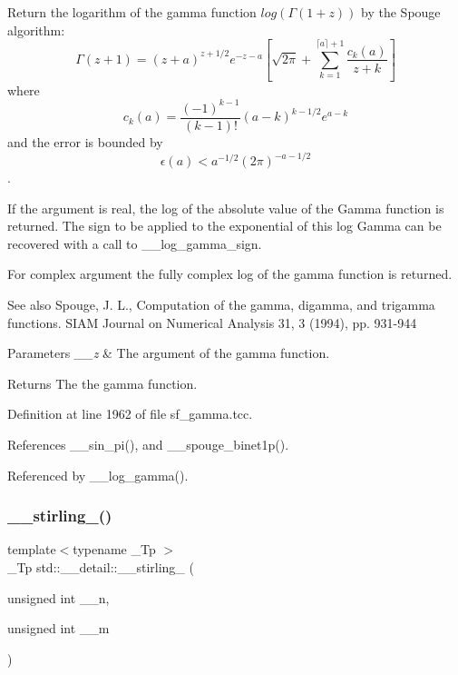 Return the logarithm of the gamma function $ log(\Gamma(1+z)) $ by the Spouge algorithm\+: \[ \Gamma(z+1) = (z+a)^{z+1/2}e^{-z-a}\left[ \sqrt{2\pi} + \sum_{k=1}^{\lceil a \rceil + 1}\frac{c_k(a)}{z+k}\right] \] where \[ c_k(a) = \frac{(-1)^{k-1}}{(k-1)!}(a-k)^{k-1/2}e^{a-k} \] and the error is bounded by \[ \epsilon(a) < a^{-1/2}(2\pi)^{-a-1/2} \]. 

If the argument is real, the log of the absolute value of the Gamma function is returned. The sign to be applied to the exponential of this log Gamma can be recovered with a call to \+\_\+\+\_\+log\+\_\+gamma\+\_\+sign.

For complex argument the fully complex log of the gamma function is returned.

\begin{DoxySeeAlso}{See also}
Spouge, J. L., Computation of the gamma, digamma, and trigamma functions. S\+I\+AM Journal on Numerical Analysis 31, 3 (1994), pp. 931-\/944
\end{DoxySeeAlso}

\begin{DoxyParams}{Parameters}
{\em \+\_\+\+\_\+z} & The argument of the gamma function. \\
\hline
\end{DoxyParams}
\begin{DoxyReturn}{Returns}
The the gamma function. 
\end{DoxyReturn}


Definition at line 1962 of file sf\+\_\+gamma.\+tcc.



References \+\_\+\+\_\+sin\+\_\+pi(), and \+\_\+\+\_\+spouge\+\_\+binet1p().



Referenced by \+\_\+\+\_\+log\+\_\+gamma().

\mbox{\label{namespacestd_1_1____detail_a8b215e4ca28ec9b7b078d7f3d9aecc17}} 
\subsubsection{\texorpdfstring{\+\_\+\+\_\+stirling\+\_()}{\_\_stirling\_1()}}
{\footnotesize\ttfamily template$<$typename \+\_\+\+Tp $>$ \\
\+\_\+\+Tp std\+::\+\_\+\+\_\+detail\+::\+\_\+\+\_\+stirling\+\_ (\begin{DoxyParamCaption}\item[{unsigned int}]{\+\_\+\+\_\+n,  }\item[{unsigned int}]{\+\_\+\+\_\+m }\end{DoxyParamCaption})}

